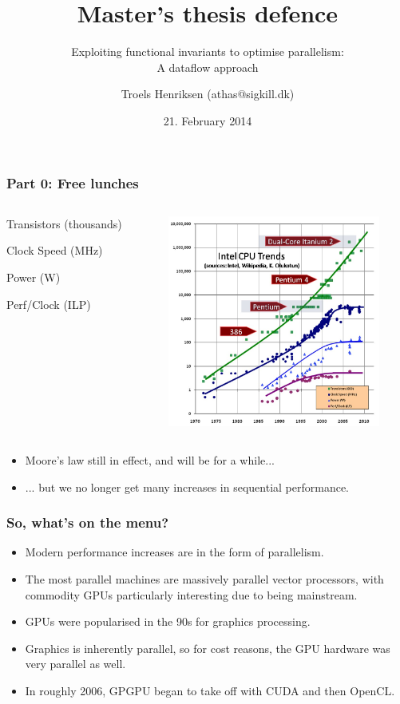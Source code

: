 \documentclass[rgb,dvipsnames]{beamer}
\title{Master's thesis defence}
\subtitle{Exploiting functional invariants to optimise parallelism:\\ A dataflow approach}
\author{Troels Henriksen (athas@sigkill.dk)}
\date{21. February 2014}
\institute{Computer Science\\
  University of Copenhagen}
\begin{document}
\frame{\titlepage}

\begin{frame}
  \frametitle{Part 0: Free lunches}

  \begin{columns}
    \begin{column}{0.3\textwidth}
      \small
      \color{OliveGreen} Transistors (thousands)

      \color{Blue} Clock Speed (MHz)

      \color{RoyalBlue} Power (W)

      \color{Purple} Perf/Clock (ILP)
    \end{column}
    \begin{column}{0.7\textwidth}
      \includegraphics[width=7cm]{img/CPU-Scaling.jpg}
    \end{column}
  \end{columns}

  \begin{itemize}
  \item Moore's law still in effect, and will be for a while...
  \item ... but we no longer get many increases in sequential
    performance.
  \end{itemize}

\end{frame}

\begin{frame}
  \frametitle{So, what's on the menu?}

  \begin{itemize}
  \item Modern performance increases are in the form of parallelism.
  \item The most parallel machines are massively parallel vector
    processors, with commodity GPUs particularly interesting due to
    being mainstream.
  \item GPUs were popularised in the 90s for graphics processing.
  \item Graphics is inherently parallel, so for cost reasons, the GPU
    hardware was very parallel as well.
  \item In roughly 2006, GPGPU began to take off with CUDA and then
    OpenCL.
  \end{itemize}
\end{frame}
\end{document}
